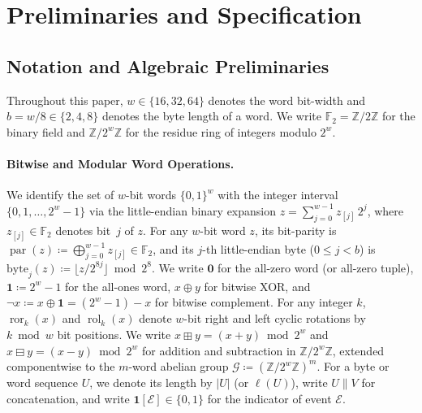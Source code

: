\documentclass[11pt,a4paper]{article}
\theoremstyle{definition}
\theoremstyle{remark}
\newcommand{\Ftwo}{\mathbb{F}_2}
\newcommand{\Zmod}[1]{\mathbb{Z}/2^{#1}\mathbb{Z}}
\newcommand{\ror}{\operatorname{ror}}
\newcommand{\rol}{\operatorname{rol}}
\newcommand{\parop}{\operatorname{par}}
\begin{document}
\section{Preliminaries and Specification}
\label{sec:spec}

\subsection{Notation and Algebraic Preliminaries}
\label{subsec:prelim}
Throughout this paper, $w \in \{16, 32, 64\}$ denotes the word bit-width and $b = w/8 \in \{2, 4, 8\}$ denotes the byte length of a word. We write $\Ftwo = \mathbb{Z}/2\mathbb{Z}$ for the binary field and $\Zmod{w}$ for the residue ring of integers modulo $2^w$.

\paragraph{Bitwise and Modular Word Operations.}
We identify the set of $w$-bit words $\{0,1\}^w$ with the integer interval $\{0, 1, \dots, 2^w - 1\}$ via the little-endian binary expansion $z = \sum_{j=0}^{w-1} z_{[j]}\,2^j$, where $z_{[j]} \in \Ftwo$ denotes bit~$j$ of $z$. For any $w$-bit word $z$, its bit-parity is $\parop(z) \coloneqq \bigoplus_{j=0}^{w-1} z_{[j]} \in \Ftwo$, and its $j$-th little-endian byte ($0 \le j < b$) is $\mathrm{byte}_j(z) \coloneqq \lfloor z / 2^{8j} \rfloor \bmod 2^8$. We write $\mathbf{0}$ for the all-zero word (or all-zero tuple), $\mathbf{1} \coloneqq 2^w - 1$ for the all-ones word, $x \oplus y$ for bitwise XOR, and $\neg x \coloneqq x \oplus \mathbf{1} = (2^w - 1) - x$ for bitwise complement. For any integer $k$, $\ror_k(x)$ and $\rol_k(x)$ denote $w$-bit right and left cyclic rotations by $k \bmod w$ bit positions. We write $x \boxplus y = (x + y) \bmod 2^w$ and $x \boxminus y = (x - y) \bmod 2^w$ for addition and subtraction in $\Zmod{w}$, extended componentwise to the $m$-word abelian group $\mathcal{G} \coloneqq (\Zmod{w})^m$. For a byte or word sequence $U$, we denote its length by $|U|$ (or $\ell(U)$), write $U \| V$ for concatenation, and write $\mathbf{1}[\mathcal{E}] \in \{0,1\}$ for the indicator of event $\mathcal{E}$.
\end{document}
